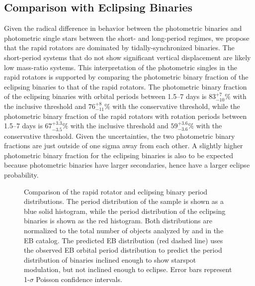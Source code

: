 \documentclass[twocolumn]{aastex6}
\begin{document}
\subsection{Comparison with Eclipsing Binaries}
\label{sec:synch}

Given the radical difference in behavior between the photometric binaries and
photometric single stars between the short- and long-period regimes, we propose that the 
rapid rotators are dominated by tidally-synchronized binaries. The 
short-period systems that do not show significant vertical displacement are 
likely low mass-ratio systems. This interpretation of the photometric singles 
in the rapid rotators is supported by comparing the photometric binary 
fraction of the eclipsing binaries to that of the rapid rotators. The 
photometric binary fraction of the eclipsing binaries with orbital periods 
between 1.5--7 days is \(83^{+7}_{-10}\%\) with the inclusive threshold and 
\(76^{+8}_{-11}\%\) with the conservative threshold, while the photometric 
binary fraction of the rapid rotators with rotation periods between 1.5--7
days is \(67^{+3.3}_{-3.5}\%\) with the inclusive threshold and
\(59^{+3.6}_{-3.6}\%\) with the conservative threshold.  Given the
uncertainties, the two photometric binary fractions are just outside of one 
sigma away from each other. A slightly higher photometric binary fraction for
the eclipsing binaries is also to be expected because photometric binaries 
have larger secondaries, hence have a larger eclipse probability.

\begin{figure}[htb]
    \centering
    \caption{Comparison of the rapid rotator and eclipsing
    binary period distributions. The period distribution of the 
    \citet{McQuillan14} sample is shown as a blue solid histogram, while the 
    period distribution of the eclipsing binaries is shown as the red 
    histogram. Both distributions are normalized to the total number of 
    objects analyzed by \citet{McQuillan14} and in the EB catalog. The 
    predicted EB distribution (red dashed line) uses the observed EB orbital
    period distribution to predict the period distribution of binaries 
    inclined enough to show starspot modulation, but not inclined enough to 
    eclipse. Error bars represent 1-\(\sigma\) Poisson confidence 
intervals.}\label{fig:eclipseprob}
\end{figure}
\end{document}

